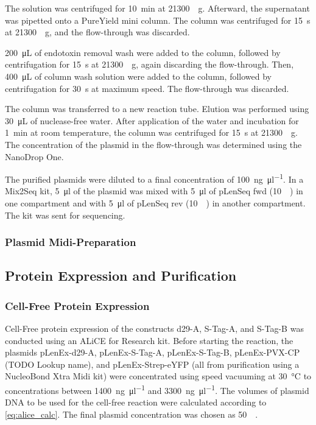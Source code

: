 The solution was centrifuged for \SI{10}{\minute} at \SI{21300}{\times g}. Afterward, the supernatant was pipetted onto a PureYield\textsuperscript{\texttrademark} mini column. The column was centrifuged for \SI{15}{\second} at \SI{21300}{\times g}, and the flow-through was discarded.

\SI{200}{\micro\liter} of endotoxin removal wash were added to the column, followed by centrifugation for \SI{15}{\second} at \SI{21300}{\times g}, again discarding the flow-through. Then, \SI{400}{\micro\liter} of column wash solution were added to the column, followed by centrifugation for \SI{30}{\second} at maximum speed. The flow-through was discarded.

The column was transferred to a new reaction tube. Elution was performed using \SI{30}{\micro\liter} of nuclease-free water. After application of the water and incubation for \SI{1}{\minute} at room temperature, the column was centrifuged for \SI{15}{\second} at \SI{21300}{\times g}. The concentration of the plasmid in the flow-through was determined using the NanoDrop\textsuperscript{\texttrademark} One.

The purified plasmids were diluted to a final concentration of \SI{100}{\nano\gram\per\micro\litre}. In a Mix2Seq kit, \SI{5}{\micro\litre} of the plasmid was mixed with \SI{5}{\micro\litre} of pLenSeq fwd (\SI{10}{\micro\Molar}) in one compartment and with \SI{5}{\micro\litre} of pLenSeq rev (\SI{10}{\micro\Molar}) in another compartment. The kit was sent for sequencing.

\subsubsection{Plasmid Midi-Preparation}

\subsection{Protein Expression and Purification}
\subsubsection{Cell-Free Protein Expression}
Cell-Free protein expression of the constructs d29-A, S-Tag-A, and S-Tag-B was conducted using an ALiCE\textsuperscript{\textregistered} for Research kit. Before starting the reaction, the plasmids pLenEx-d29-A, pLenEx-S-Tag-A, pLenEx-S-Tag-B, pLenEx-PVX-CP (TODO Lookup name), and pLenEx-Strep-eYFP (all from purification using a NucleoBond Xtra Midi kit) were concentrated using speed vacuuming at \SI{30}{\degreeCelsius} to concentrations between \SI{1400}{\nano\gram\per\micro\litre} and \SI{3300}{\nano\gram\per\micro\litre}. The volumes of plasmid DNA to be used for the cell-free reaction were calculated according to \autoref{eq:alice_calc}. The final plasmid concentration was chosen as \SI{50}{\nano\Molar}. 


